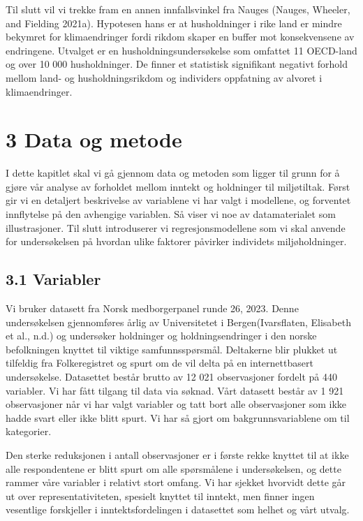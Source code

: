 \documentclass[
  12pt,
  letterpaper,
  DIV=11,
  numbers=noendperiod]{scrartcl}
\begin{document}
Til slutt vil vi trekke fram en annen innfallsvinkel fra Nauges (Nauges,
Wheeler, and Fielding 2021a). Hypotesen hans er at husholdninger i rike
land er mindre bekymret for klimaendringer fordi rikdom skaper en buffer
mot konsekvensene av endringene. Utvalget er en husholdningsundersøkelse
som omfattet 11 OECD-land og over 10 000 husholdninger. De finner et
statistisk signifikant negativt forhold mellom land- og
husholdningsrikdom og individers oppfatning av alvoret i klimaendringer.

\hypertarget{data-og-metode}{%
\section{3 Data og metode}\label{data-og-metode}}

I dette kapitlet skal vi gå gjennom data og metoden som ligger til grunn
for å gjøre vår analyse av forholdet mellom inntekt og holdninger til
miljøtiltak. Først gir vi en detaljert beskrivelse av variablene vi har
valgt i modellene, og forventet innflytelse på den avhengige variablen.
Så viser vi noe av datamaterialet som illustrasjoner. Til slutt
introduserer vi regresjonsmodellene som vi skal anvende for
undersøkelsen på hvordan ulike faktorer påvirker individets
miljøholdninger.

\hypertarget{variabler}{%
\subsection{3.1 Variabler}\label{variabler}}

Vi bruker datasett fra Norsk medborgerpanel runde 26, 2023. Denne
undersøkelsen gjennomføres årlig av Universitetet i Bergen(Ivarsflaten,
Elisabeth et al., n.d.) og undersøker holdninger og holdningsendringer i
den norske befolkningen knyttet til viktige samfunnsspørsmål. Deltakerne
blir plukket ut tilfeldig fra Folkeregistret og spurt om de vil delta på
en internettbasert undersøkelse. Datasettet består brutto av 12 021
observasjoner fordelt på 440 variabler. Vi har fått tilgang til data via
søknad. Vårt datasett består av 1 921 observasjoner når vi har valgt
variabler og tatt bort alle observasjoner som ikke hadde svart eller
ikke blitt spurt. Vi har så gjort om bakgrunnsvariablene om til
kategorier.

Den sterke reduksjonen i antall observasjoner er i første rekke knyttet
til at ikke alle respondentene er blitt spurt om alle spørsmålene i
undersøkelsen, og dette rammer våre variabler i relativt stort omfang.
Vi har sjekket hvorvidt dette går ut over representativiteten, spesielt
knyttet til inntekt, men finner ingen vesentlige forskjeller i
inntektsfordelingen i datasettet som helhet og vårt utvalg.
\end{document}
